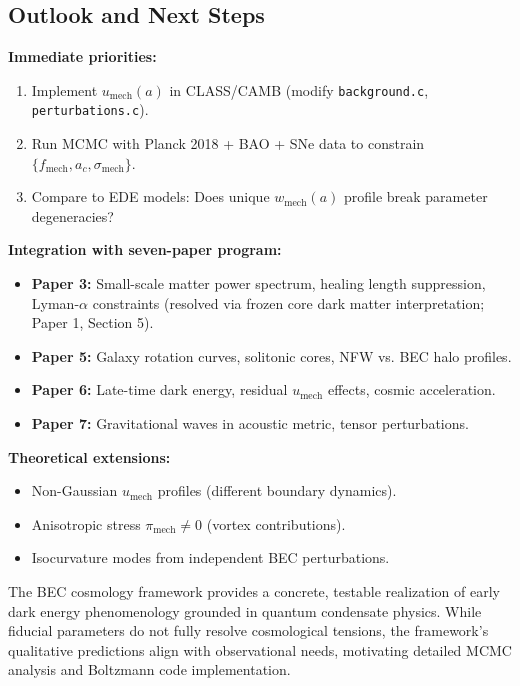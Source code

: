 \documentclass[11pt,a4paper]{article}
\newcommand{\umech}{\ensuremath{u_{\mathrm{mech}}}}
\newcommand{\wmech}{\ensuremath{w_{\mathrm{mech}}}}
\newcommand{\fmech}{\ensuremath{f_{\mathrm{mech}}}}
\newcommand{\ac}{\ensuremath{a_c}}
\newcommand{\sigmamech}{\ensuremath{\sigma_{\mathrm{mech}}}}
\theoremstyle{definition}
\theoremstyle{remark}
\begin{document}
\subsection{Outlook and Next Steps}
\label{sec:outlook}

\textbf{Immediate priorities:}
\begin{enumerate}[leftmargin=*, itemsep=0.2em]
\item Implement $\umech(a)$ in CLASS/CAMB (modify \texttt{background.c}, \texttt{perturbations.c}).
\item Run MCMC with Planck 2018 + BAO + SNe data to constrain $\{\fmech, \ac, \sigmamech\}$.
\item Compare to EDE models: Does unique $\wmech(a)$ profile break parameter degeneracies?
\end{enumerate}

\textbf{Integration with seven-paper program:}
\begin{itemize}[leftmargin=*, itemsep=0.2em]
\item \textbf{Paper 3:} Small-scale matter power spectrum, healing length suppression, Lyman-$\alpha$ constraints (resolved via frozen core dark matter interpretation; Paper 1, Section 5).
\item \textbf{Paper 5:} Galaxy rotation curves, solitonic cores, NFW vs. BEC halo profiles.
\item \textbf{Paper 6:} Late-time dark energy, residual $\umech$ effects, cosmic acceleration.
\item \textbf{Paper 7:} Gravitational waves in acoustic metric, tensor perturbations.
\end{itemize}

\textbf{Theoretical extensions:}
\begin{itemize}[leftmargin=*, itemsep=0.2em]
\item Non-Gaussian $\umech$ profiles (different boundary dynamics).
\item Anisotropic stress $\pi_{\mathrm{mech}} \neq 0$ (vortex contributions).
\item Isocurvature modes from independent BEC perturbations.
\end{itemize}

The BEC cosmology framework provides a concrete, testable realization of early dark energy phenomenology grounded in quantum condensate physics. While fiducial parameters do not fully resolve cosmological tensions, the framework's qualitative predictions align with observational needs, motivating detailed MCMC analysis and Boltzmann code implementation.
\end{document}
